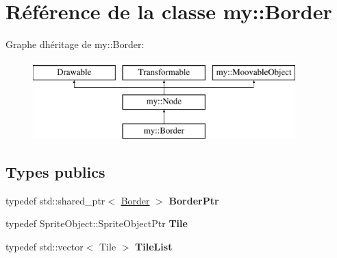 \hypertarget{classmy_1_1Border}{}\section{Référence de la classe my\+:\+:Border}
\label{classmy_1_1Border}
Graphe d\textquotesingle{}héritage de my\+:\+:Border\+:\begin{figure}[H]
\begin{center}
\leavevmode
\includegraphics[height=3.000000cm]{classmy_1_1Border}
\end{center}
\end{figure}
\subsection*{Types publics}
\begin{DoxyCompactItemize}
\item 
\mbox{\label{classmy_1_1Border_ac25a32ed037962d5513c63e60a510f8e}} 
typedef std\+::shared\+\_\+ptr$<$ \hyperlink{classmy_1_1Border}{Border} $>$ {\bfseries Border\+Ptr}
\item 
\mbox{\label{classmy_1_1Border_a183b7d4c2bd05d33120eccd7b1c38680}} 
typedef Sprite\+Object\+::\+Sprite\+Object\+Ptr {\bfseries Tile}
\item 
\mbox{\label{classmy_1_1Border_a71eaaf9ddced3cb6ca06df43d460cf80}} 
typedef std\+::vector$<$ Tile $>$ {\bfseries Tile\+List}
\end{DoxyCompactItemize}
